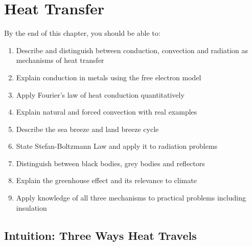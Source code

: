 %

\chapter{Heat Transfer}
\label{ch:heat_transfer}
\minitoc
\newpage


\begin{objectivebox}
By the end of this chapter, you should be able to:
\begin{enumerate}[noitemsep]
  \item Describe and distinguish between conduction,
  convection and radiation as mechanisms of heat transfer
  \item Explain conduction in metals using the free
  electron model
  \item Apply Fourier's law of heat conduction
  quantitatively
  \item Explain natural and forced convection with
  real examples
  \item Describe the sea breeze and land breeze cycle
  \item State Stefan-Boltzmann Law and apply it to
  radiation problems
  \item Distinguish between black bodies, grey bodies
  and reflectors
  \item Explain the greenhouse effect and its
  relevance to climate
  \item Apply knowledge of all three mechanisms to
  practical problems including insulation
\end{enumerate}
\end{objectivebox}

\section{Intuition: Three Ways Heat Travels}

